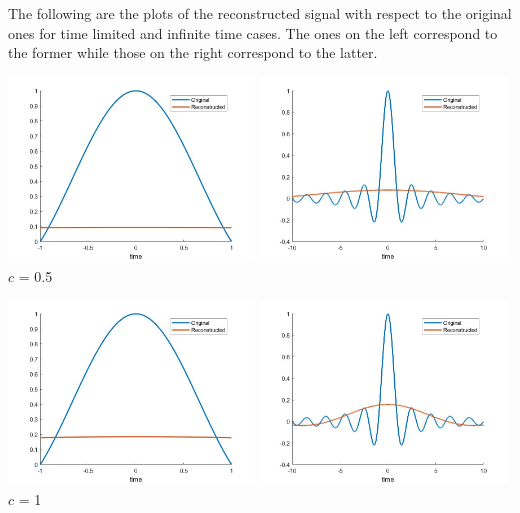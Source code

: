 \documentclass[a4paper,10pt]{article}
\begin{document}
The following are the plots of the reconstructed signal with respect to the original ones for time limited and infinite time cases. The ones on the left correspond to the former while those on the right correspond to the latter.
\begin{center}
\includegraphics[width=0.49\textwidth]{"recon_tl_0.5.jpg"}
\includegraphics[width=0.49\textwidth]{"recon_0.5.jpg"}
\small{$c$ = 0.5}

\includegraphics[width=0.49\textwidth]{"recon_tl_1.jpg"}
\includegraphics[width=0.49\textwidth]{"recon_1.jpg"}
\small{$c$ = 1}


\end{center}
\end{document}
